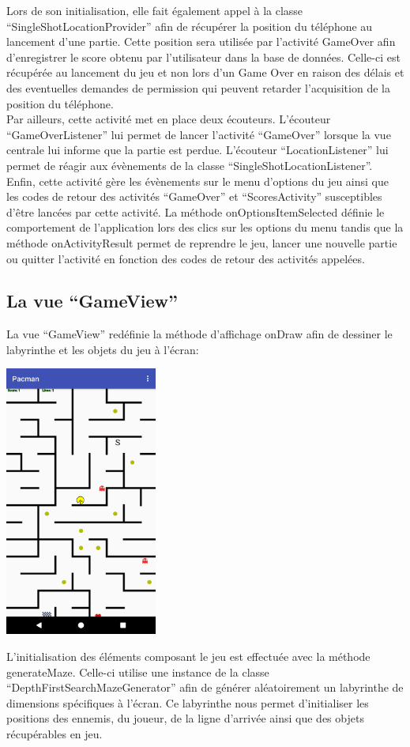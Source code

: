 \documentclass{article}
\begin{document}
Lors de son initialisation, elle fait également appel à la classe \enquote{SingleShotLocationProvider} afin de récupérer la position du téléphone au lancement d'une partie.
Cette position sera utilisée par l'activité GameOver afin d'enregistrer le score obtenu par l'utilisateur dans la base de données.
Celle-ci est récupérée au lancement du jeu et non lors d'un Game Over en raison des délais et des eventuelles demandes de permission qui peuvent retarder l'acquisition de la position du téléphone.\\

Par ailleurs, cette activité met en place deux écouteurs. 
L'écouteur \enquote{GameOverListener} lui permet de lancer l'activité \enquote{GameOver} lorsque la vue centrale lui informe que la partie est perdue.
L'écouteur \enquote{LocationListener} lui permet de réagir aux évènements de la classe \enquote{SingleShotLocationListener}.\\

Enfin, cette activité gère les évènements sur le menu d'options du jeu ainsi que les codes de retour des activités \enquote{GameOver} et \enquote{ScoresActivity} susceptibles d'être lancées par cette activité.
La méthode onOptionsItemSelected définie le comportement de l'application lors des clics sur les options du menu tandis que la méthode onActivityResult permet de reprendre le jeu, lancer une nouvelle partie ou quitter l'activité en fonction des codes de retour des activités appelées.


\subsection{La vue \enquote{GameView}}
La vue \enquote{GameView} redéfinie la méthode d'affichage onDraw afin de dessiner le labyrinthe et les objets du jeu à l'écran:
\begin{center}
  \includegraphics[width=5cm]{game_screen.png}
\end{center}
L'initialisation des éléments composant le jeu est effectuée avec la méthode generateMaze. 
Celle-ci utilise une instance de la classe \enquote{DepthFirstSearchMazeGenerator} afin de générer aléatoirement un labyrinthe de dimensions spécifiques à l'écran.
Ce labyrinthe nous permet d'initialiser les positions des ennemis, du joueur, de la ligne d'arrivée ainsi que des objets récupérables en jeu.\\
\end{document}
